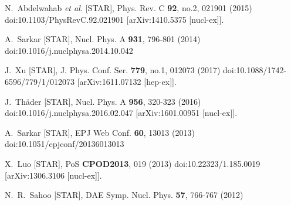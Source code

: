 
\begin{thebibliography}{99}

N.~Abdelwahab \textit{et al.} [STAR],
Phys. Rev. C \textbf{92}, no.2, 021901 (2015)
doi:10.1103/PhysRevC.92.021901
[arXiv:1410.5375 [nucl-ex]].

A.~Sarkar [STAR],
Nucl. Phys. A \textbf{931}, 796-801 (2014)
doi:10.1016/j.nuclphysa.2014.10.042

J.~Xu [STAR],
J. Phys. Conf. Ser. \textbf{779}, no.1, 012073 (2017)
doi:10.1088/1742-6596/779/1/012073
[arXiv:1611.07132 [hep-ex]].

J.~Thäder [STAR],
Nucl. Phys. A \textbf{956}, 320-323 (2016)
doi:10.1016/j.nuclphysa.2016.02.047
[arXiv:1601.00951 [nucl-ex]].

A.~Sarkar [STAR],
EPJ Web Conf. \textbf{60}, 13013 (2013)
doi:10.1051/epjconf/20136013013

X.~Luo [STAR],
PoS \textbf{CPOD2013}, 019 (2013)
doi:10.22323/1.185.0019
[arXiv:1306.3106 [nucl-ex]].

N.~R.~Sahoo [STAR],
DAE Symp. Nucl. Phys. \textbf{57}, 766-767 (2012)


\end{thebibliography}
